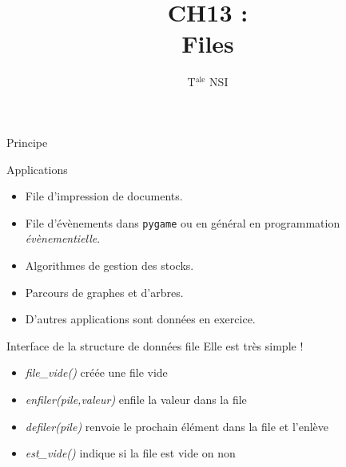 \documentclass[10pt]{beamer}
\title{CH13 : \\Files}
\author{T$^{\text{ale}}$ NSI}
\begin{document}
	\maketitle

\begin{frame}{Principe}
\end{frame}
\begin{frame}{Applications}
	\begin{itemize}
		\item 	File d'impression de documents.
		\item 	File d'évènements dans \texttt{pygame} ou en général en programmation \textit{évènementielle}.
		\item	Algorithmes de gestion des stocks.
		\item 	Parcours de graphes et d'arbres.
		\item 	D'autres applications sont données en exercice.
	\end{itemize}
\end{frame}
\begin{frame}{Interface de la structure de données file}
	Elle est très simple !
	\begin{itemize}
		\item \textit{file\_vide()} créée une file vide
		\item \textit{enfiler(pile,valeur)} enfile la valeur dans la file
		\item  \textit{defiler(pile)} renvoie le prochain élément dans la file et l'enlève
		\item \textit{est\_vide()} indique si la file est vide on non	 
	\end{itemize}
\end{frame}
\end{document}

